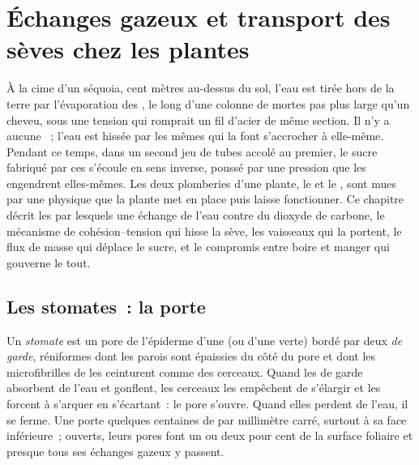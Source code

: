 \chapter{Échanges gazeux et transport des sèves chez les plantes}\label{ch:b1:plant-transport}

À la cime d'un séquoia, cent mètres au-dessus du sol, l'eau est tirée
hors de la terre par l'évaporation des , le long d'une colonne
de  mortes pas plus large qu'un cheveu, sous une tension qui
romprait un fil d'acier de même section. Il n'y a aucune ~; l'eau
est hissée par les  mêmes qui la font s'accrocher à
elle-même. Pendant ce temps, dans un second jeu de tubes accolé au
premier, le sucre fabriqué par ces  s'écoule en sens inverse,
poussé par une pression que les  engendrent elles-mêmes. Les
deux plomberies d'une plante, le  et le , sont mues par
une physique que la plante met en place puis laisse fonctionner. Ce
chapitre décrit les  par lesquels une  échange de l'eau
contre du dioxyde de carbone, le mécanisme de cohésion--tension qui
hisse la sève, les vaisseaux qui la portent, le flux de masse qui
déplace le sucre, et le compromis entre boire et manger qui gouverne
le tout.

\section{Les stomates~: la porte}

\begin{definition}\label{def:b1:plant-transport:stoma}
Un \emph{stomate} est un pore de l'épiderme d'une  (ou d'une
 verte) bordé par deux \emph{ de garde}, 
réniformes dont les parois sont épaissies du côté du pore et dont les
microfibrilles de  les ceinturent comme des cerceaux. Quand
les  de garde absorbent de l'eau et gonflent, les cerceaux les
empêchent de s'élargir et les forcent à s'arquer en s'écartant~: le
pore s'ouvre. Quand elles perdent de l'eau, il se ferme. Une 
porte quelques centaines de  par millimètre carré, surtout à
sa face inférieure~; ouverts, leurs pores font un ou deux pour cent de
la surface foliaire et presque tous ses échanges gazeux y passent.
\end{definition}

